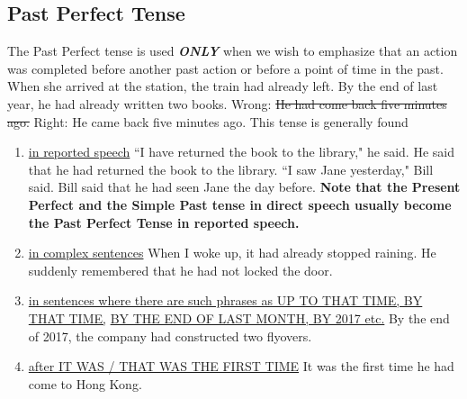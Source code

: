 \subsection{Past Perfect Tense}
The Past Perfect tense is used {\bf\it{ONLY}} when we wish to emphasize that an
action was completed before another past action or before a point of time in the
past.
\newline
\newline
When she arrived at the station, the train had already left.
\newline
By the end of last year, he had already written two books.
\newline
Wrong: \st{He had come back five minutes ago.}
\newline
Right: He came back five minutes ago.
\newline
\newline
This tense is generally found
\begin{enumerate}
    \item \underline{in reported speech}
        \newline
        \newline
        ``I have returned the book to the library," he said.
        \newline
        He said that he had returned the book to the library.
        \newline
        ``I saw Jane yesterday," Bill said.
        \newline
        Bill said that he had seen Jane the day before.
        \newline
        {\bf Note that the Present Perfect and the Simple Past tense in direct
        speech usually become the Past Perfect Tense in reported speech.}
    \item \underline{in complex sentences}
        \newline
        \newline
        When I woke up, it had already stopped raining.
        \newline
        He suddenly remembered that he had not locked the door.
    \item \underline{in sentences where there are such phrases as UP TO THAT
        TIME, BY THAT TIME,}
        \newline
        \underline{BY THE END OF LAST MONTH, BY 2017 etc.}
        \newline
        \newline
        By the end of 2017, the company had constructed two flyovers.
    \item \underline{after IT WAS / THAT WAS THE FIRST TIME}
        \newline
        \newline
        It was the first time he had come to Hong Kong.
\end{enumerate}

